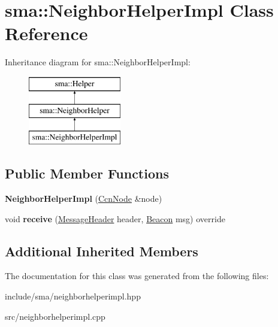 \hypertarget{classsma_1_1NeighborHelperImpl}{\section{sma\-:\-:Neighbor\-Helper\-Impl Class Reference}
\label{classsma_1_1NeighborHelperImpl}
}
Inheritance diagram for sma\-:\-:Neighbor\-Helper\-Impl\-:\begin{figure}[H]
\begin{center}
\leavevmode
\includegraphics[height=3.000000cm]{classsma_1_1NeighborHelperImpl}
\end{center}
\end{figure}
\subsection*{Public Member Functions}
\begin{DoxyCompactItemize}
\item 
\hypertarget{classsma_1_1NeighborHelperImpl_a77420dbc9ea439a082a85b31461a2b10}{{\bfseries Neighbor\-Helper\-Impl} (\hyperlink{classsma_1_1CcnNode}{Ccn\-Node} \&node)}\label{classsma_1_1NeighborHelperImpl_a77420dbc9ea439a082a85b31461a2b10}

\item 
\hypertarget{classsma_1_1NeighborHelperImpl_a016eb3acd4c3194ddb9a2ca9432a207c}{void {\bfseries receive} (\hyperlink{structsma_1_1MessageHeader}{Message\-Header} header, \hyperlink{structsma_1_1Beacon}{Beacon} msg) override}\label{classsma_1_1NeighborHelperImpl_a016eb3acd4c3194ddb9a2ca9432a207c}

\end{DoxyCompactItemize}
\subsection*{Additional Inherited Members}


The documentation for this class was generated from the following files\-:\begin{DoxyCompactItemize}
\item 
include/sma/neighborhelperimpl.\-hpp\item 
src/neighborhelperimpl.\-cpp\end{DoxyCompactItemize}
